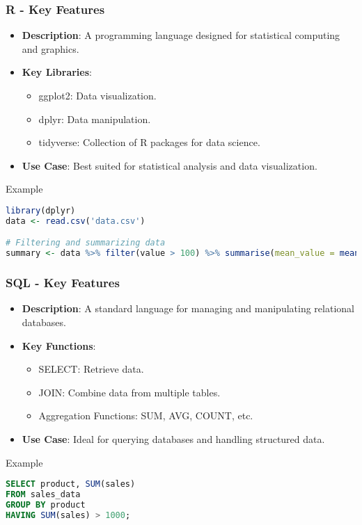\documentclass[aspectratio=169]{beamer}
\begin{document}
\begin{frame}[fragile]
    \frametitle{R - Key Features}
    \begin{itemize}
        \item \textbf{Description}: A programming language designed for statistical computing and graphics.
        \item \textbf{Key Libraries}:
        \begin{itemize}
            \item ggplot2: Data visualization.
            \item dplyr: Data manipulation.
            \item tidyverse: Collection of R packages for data science.
        \end{itemize}
        \item \textbf{Use Case}: Best suited for statistical analysis and data visualization.
    \end{itemize}
    \begin{block}{Example}
        \begin{lstlisting}[language=R]
library(dplyr)
data <- read.csv('data.csv')

# Filtering and summarizing data
summary <- data %>% filter(value > 100) %>% summarise(mean_value = mean(value))
        \end{lstlisting}
    \end{block}
\end{frame}

\begin{frame}[fragile]
    \frametitle{SQL - Key Features}
    \begin{itemize}
        \item \textbf{Description}: A standard language for managing and manipulating relational databases.
        \item \textbf{Key Functions}:
        \begin{itemize}
            \item SELECT: Retrieve data.
            \item JOIN: Combine data from multiple tables.
            \item Aggregation Functions: SUM, AVG, COUNT, etc.
        \end{itemize}
        \item \textbf{Use Case}: Ideal for querying databases and handling structured data.
    \end{itemize}
    \begin{block}{Example}
        \begin{lstlisting}[language=SQL]
SELECT product, SUM(sales) 
FROM sales_data 
GROUP BY product 
HAVING SUM(sales) > 1000;
        \end{lstlisting}
    \end{block}
\end{frame}
\end{document}
